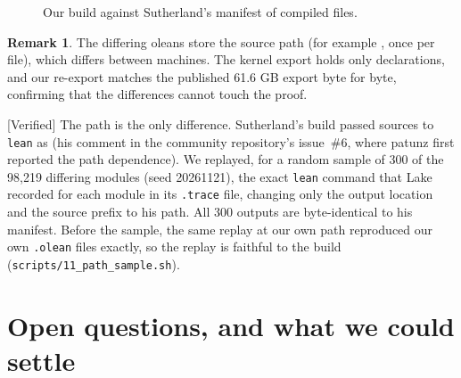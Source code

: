 \documentclass[11pt]{article}
\newcommand{\Verified}{\textcolor{verc}{\textsf{\small[Verified]}}}
\theoremstyle{plain}
\theoremstyle{definition}
\newtheorem{remark}[theorem]{Remark}
\begin{document}
\begin{figure}[ht]
\centering
{}
\caption{Our build against Sutherland's manifest of compiled files.}\label{fig:oleans}
\end{figure}

\begin{remark}
The differing oleans store the source path (for example
, once per file), which differs between machines.
The kernel export holds only declarations, and our re-export matches the published 61.6 GB export
byte for byte, confirming that the differences cannot touch the proof.
\end{remark}

\Verified{} The path is the only difference. Sutherland's build passed sources to \texttt{lean} as
 (his comment in the community repository's
issue~\#6, where patunz first reported the path dependence). We replayed, for a random sample of 300 of
the 98{,}219 differing modules (seed 20261121), the exact \texttt{lean} command that Lake recorded for
each module in its \texttt{.trace} file, changing only the output location and the source prefix to his
path. All 300 outputs are byte-identical to his manifest. Before the sample, the same replay at our own
path reproduced our own \texttt{.olean} files exactly, so the replay is faithful to the build
(\texttt{scripts/11\_path\_sample.sh}).

\section{Open questions, and what we could settle}\label{sec:open}
\end{document}
